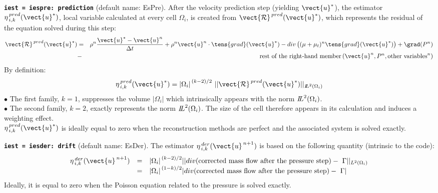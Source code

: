 {\tt \bf iest = iespre: prediction} (default name: EsPre).
After the velocity prediction step (yielding $\vect{u}^*$), the
estimator $\eta^{\,pred}_{\,i,k}(\vect{u}^*)$, local variable calculated
at every cell $\Omega_i$, is created from $\vect{\mathcal
R}^{\,pred}(\vect{u}^*)$, which represents the residual of the equation
solved during this step:
\begin{eqnarray*}
\vect{\mathcal R}^{\,pred}(\vect{u}^*)&= & \rho^n \frac{\vect{u}^*-\vect{u}^n}{\Delta t}
              + \rho^n \vect{u}^n \cdot \tens{grad}(\vect{u}^*)
              - div \left((\mu+\mu_t)^n \tens{grad}(\vect{u}^*) \right)
              + \grad(P^n)     \\
              &- &\text{rest of the right-hand member}
                        \,(\vect{u}^n, P^n, \text{other variables}^n)
\end{eqnarray*}
By definition:
$$ \eta^{\,pred}_{\,i,k}(\vect{u}^*)= {|\Omega_i|}^{\,(k-2)/2}\ ||\vect{\mathcal R}^{\,pred}(\vect{u}^*)||
_{{I\hspace{-.25em}L}^{2}(\Omega_i)}$$
\hspace*{0.5cm}$\bullet$ The first family, $k=1$, suppresses the
volume $|\Omega_i|$ which intrinsically appears with the norm
${{I\hspace{-.25em}L}^{2}(\Omega_i)}$.\\
\hspace*{0.5cm}$\bullet$ The second family, $k=2$, exactly represents the norm
${{I\hspace{-.25em}L}^{2}(\Omega_i)}$. The size of the cell therefore
appears in its calculation and induces a weighting effect.\\
$ \eta^{\,pred}_{\,i,k}(\vect{u}^*)$  is ideally equal to zero when the
reconstruction methods are perfect and the associated system is
solved exactly.

{\tt \bf iest = iesder: drift}  (default name: EsDer).
The estimator $\eta^{\,der}_{\,i,k}(\vect{u}^{\,n+1})$ is based on the
following quantity (intrinsic to the code):
\begin{equation}
\begin{array}{lll}
 \eta^{\,der}_{\,i,k}(\vect{u}^{\,n+1})
&=& {|\Omega_i|}^{\,(k-2)/2}
||div (\text{corrected mass flow after the pressure step})
                                              -\ \Gamma||_{{L}^{2}(\Omega_i)} \\
&=& {|\Omega_i|}^{\,(1-k)/2}
|div (\text{corrected mass flow after the pressure step})-\ \Gamma|
\end{array}
\end{equation}
Ideally, it is equal to zero when the Poisson equation related to the pressure is
solved exactly.

